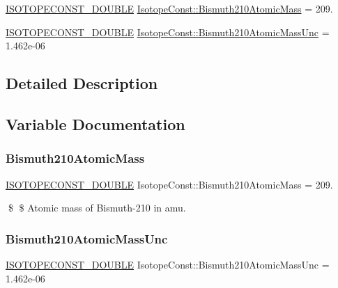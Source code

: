\begin{DoxyCompactItemize}
\item 
\mbox{\hyperlink{group___isotope_const-_macros_ga8f45a7272ce02c0b4c65c44636ed719a}{I\+S\+O\+T\+O\+P\+E\+C\+O\+N\+S\+T\+\_\+\+D\+O\+U\+B\+LE}} \mbox{\hyperlink{group___isotope_const-_bismuth-_bi210_ga82aadd71899f8a3cb8791af6cee70aa3}{Isotope\+Const\+::\+Bismuth210\+Atomic\+Mass}} = 209.
\item 
\mbox{\hyperlink{group___isotope_const-_macros_ga8f45a7272ce02c0b4c65c44636ed719a}{I\+S\+O\+T\+O\+P\+E\+C\+O\+N\+S\+T\+\_\+\+D\+O\+U\+B\+LE}} \mbox{\hyperlink{group___isotope_const-_bismuth-_bi210_gabb4e09afd49fc21f7e3cd5b4ff347119}{Isotope\+Const\+::\+Bismuth210\+Atomic\+Mass\+Unc}} = 1.\+462e-\/06
\end{DoxyCompactItemize}


\subsection{Detailed Description}


\subsection{Variable Documentation}
\mbox{\label{group___isotope_const-_bismuth-_bi210_ga82aadd71899f8a3cb8791af6cee70aa3}} 
\subsubsection{\texorpdfstring{Bismuth210\+Atomic\+Mass}{Bismuth210AtomicMass}}
{\footnotesize\ttfamily \mbox{\hyperlink{group___isotope_const-_macros_ga8f45a7272ce02c0b4c65c44636ed719a}{I\+S\+O\+T\+O\+P\+E\+C\+O\+N\+S\+T\+\_\+\+D\+O\+U\+B\+LE}} Isotope\+Const\+::\+Bismuth210\+Atomic\+Mass = 209.}

\$ \$ Atomic mass of Bismuth-\/210 in amu. \mbox{\label{group___isotope_const-_bismuth-_bi210_gabb4e09afd49fc21f7e3cd5b4ff347119}} 
\subsubsection{\texorpdfstring{Bismuth210\+Atomic\+Mass\+Unc}{Bismuth210AtomicMassUnc}}
{\footnotesize\ttfamily \mbox{\hyperlink{group___isotope_const-_macros_ga8f45a7272ce02c0b4c65c44636ed719a}{I\+S\+O\+T\+O\+P\+E\+C\+O\+N\+S\+T\+\_\+\+D\+O\+U\+B\+LE}} Isotope\+Const\+::\+Bismuth210\+Atomic\+Mass\+Unc = 1.\+462e-\/06}

